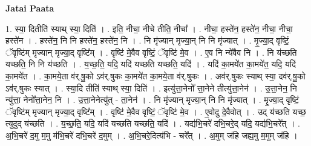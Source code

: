 \documentclass[17pt]{extarticle}
\begin{document}
\textbf{Jatai Paata} \newline

1. स्या॒ दितीति॑ स्याथ् स्या॒ दिति॑ । . इति॒ नीचा॒ नीचे तीति॒ नीचा᳚ । . नीचा॒ हस्ते॑न॒ हस्ते॑न॒ नीचा॒ नीचा॒ हस्ते॑न । . हस्ते॑न॒ नि नि हस्ते॑न॒ हस्ते॑न॒ नि । . नि मृ॑ज्यान् मृज्या॒न् नि नि मृ॑ज्यात् । . मृ॒ज्या॒द् वृष्टिं॒ ॅवृष्टि॑म् मृज्यान् मृज्या॒द् वृष्टि᳚म् । . वृष्टि॑ मे॒वैव वृष्टिं॒ ॅवृष्टि॑ मे॒व । . ए॒व नि न्ये॑वैव नि । . नि य॑च्छति यच्छति॒ नि नि य॑च्छति । . य॒च्छ॒ति॒ यदि॒ यदि॑ यच्छति यच्छति॒ यदि॑ । . यदि॑ का॒मये॑त का॒मये॑त॒ यदि॒ यदि॑ का॒मये॑त । . का॒मये॒ता व॑र्.षु॒को ऽव॑र्.षुकः का॒मये॑त का॒मये॒ता व॑र्.षुकः । . अव॑र्.षुकः स्याथ् स्या॒ दव॑र्.षु॒को ऽव॑र्.षुकः स्यात् । . स्या॒दि तीति॑ स्याथ् स्या॒ दिति॑ । . इत्यु॑त्ता॒नेनो᳚ त्ता॒नेने तीत्यु॑त्ता॒नेन॑ । . उ॒त्ता॒नेन॒ नि न्यु॑त्ता॒ नेनो᳚त्ता॒नेन॒ नि । . उ॒त्ता॒नेनेत्यु॑त् - ता॒नेन॑ । . नि मृ॑ज्यान् मृज्या॒न् नि नि मृ॑ज्यात् । . मृ॒ज्या॒द् वृष्टिं॒ ॅवृष्टि॑म् मृज्यान् मृज्या॒द् वृष्टि᳚म् । . वृष्टि॑ मे॒वैव वृष्टिं॒ ॅवृष्टि॑ मे॒व । . ए॒वोदु दे॒वैवोत् । . उद् य॑च्छति यच्छ॒ त्युदुद् य॑च्छति । . य॒च्छ॒ति॒ यदि॒ यदि॑ यच्छति यच्छति॒ यदि॑ । . यद्य॑भि॒चरे॑ दभि॒चरे॒द् यदि॒ यद्य॑भि॒चरे᳚त् । . अ॒भि॒चरे॑ द॒मु म॒मु म॑भि॒चरे॑ दभि॒चरे॑ द॒मुम् । . अ॒भि॒चरे॒दित्य॑भि - चरे᳚त् । . अ॒मुम् ज॑हि जह्य॒मु म॒मुम् ज॑हि । \newline
\end{document}
